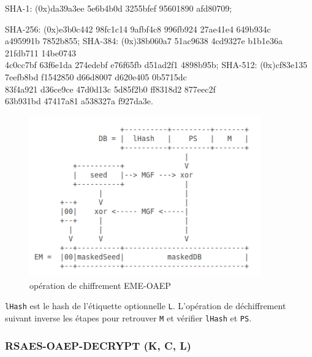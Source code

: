 \begin{description}
    \item SHA-1: (0x)da39a3ee 5e6b4b0d 3255bfef 95601890 afd80709;
    \item SHA-256: (0x)e3b0c442 98fc1c14 9afbf4c8 996fb924 27ae41e4 649b934c\\
                a495991b 7852b855;
    SHA-384: (0x)38b060a7 51ac9638 4cd9327e b1b1e36a 21fdb711 14be0743\\
                4c0cc7bf 63f6e1da 274edebf e76f65fb d51ad2f1 4898b95b;
    SHA-512: (0x)cf83e135 7eefb8bd f1542850 d66d8007 d620e405 0b5715dc\\
                83f4a921 d36ce9ce 47d0d13c 5d85f2b0 ff8318d2 877eec2f\\
                63b931bd 47417a81 a538327a f927da3e.\\
\end{description}

\begin{figure}[H]
\centering
\includegraphics[width=10cm]{images/schema.png}
\caption{opération de chiffrement EME-OAEP}
\label{fig21}
\end{figure}

\texttt{lHash} est le hash de l'étiquette optionnelle \texttt{L}. L'opération de déchiffrement suivant inverse les étapes pour retrouver \texttt{M} et vérifier \texttt{lHash} et \texttt{PS}.


\subsubsection{RSAES-OAEP-DECRYPT (K, C, L)}

